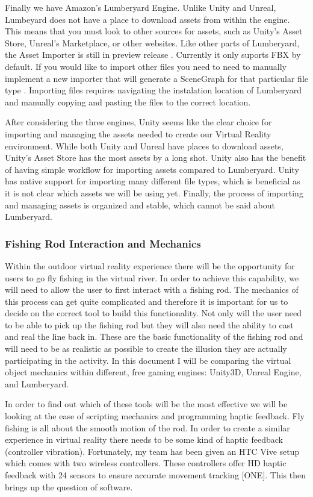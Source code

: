 \documentclass[10pt,journal,compsoc,onecolumn, draftclsnofoot]{IEEEtran}
\begin{document}
Finally we have Amazon's Lumberyard Engine.
Unlike Unity and Unreal, Lumbeyard does not have a place to download assets from within the engine.
This means that you must look to other sources for assets, such as Unity's Asset Store, Unreal's Marketplace, or other websites.
Like other parts of Lumberyard, the Asset Importer is still in preview release \cite{lumberyard_asset_import}.
Currently it only suports FBX by default.
If you would like to import other files you need to need to manually implement a new importer that will generate a SceneGraph for that particular file type \cite{lumberyard_asset_import}.
Importing files requires navigating the instalation location of Lumberyard and manually copying and pasting the files to the correct location.

After considering the three engines, Unity seems like the clear choice for importing and managing the assets needed to create our Virtual Reality environment.
While both Unity and Unreal have places to download assets, Unity's Asset Store has the most assets by a long shot.
Unity also has the benefit of having simple workflow for importing assets compared to Lumberyard.
Unity has native support for importing many different file types, which is beneficial as it is not clear which assets we will be using yet.
Finally, the process of importing and managing assets is organized and stable, which cannot be said about Lumberyard.

\subsubsection{Fishing Rod Interaction and Mechanics}
Within the outdoor virtual reality experience there will be the opportunity for users to go fly fishing in the virtual river.
In order to achieve this capability, we will need to allow the user to first interact with a fishing rod.
The mechanics of this process can get quite complicated and therefore it is important for us to decide on the correct tool to build this functionality.
Not only will the user need to be able to pick up the fishing rod but they will also need the ability to cast and real the line back in.
These are the basic functionality of the fishing rod and will need to be as realistic as possible to create the illusion they are actually participating in the activity.
In this document I will be comparing the virtual object mechanics within different, free gaming engines: Unity3D, Unreal Engine, and Lumberyard.

In order to find out which of these tools will be the most effective we will be looking at the ease of scripting mechanics and programming haptic feedback.
Fly fishing is all about the smooth motion of the rod.
In order to create a similar experience in virtual reality there needs to be some kind of haptic feedback (controller vibration).
Fortunately, my team has been given an HTC Vive setup which comes with two wireless controllers.
These controllers offer HD haptic feedback with 24 sensors to ensure accurate movement tracking [ONE].
This then brings up the question of software.
\end{document}
